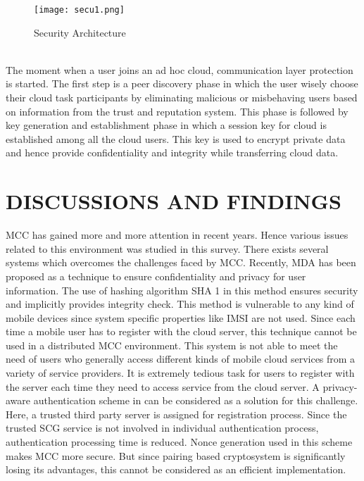 \documentclass[10pt,a4paper,journal]{IEEEtran}
\begin{document}
\begin{figure}[htbp]
\centering
\texttt{[image: secu1.png]} 
\caption{Security Architecture \cite{1}}
\label{10}
\end{figure}\\
The moment when a user joins an ad hoc cloud, communication layer protection is started. The first step is a peer discovery phase in which the user wisely choose their cloud task participants by
eliminating malicious or misbehaving users based on information from the trust and reputation system. This phase is followed by key generation and establishment phase in which a session key for cloud is established among all the cloud users. This key is used to encrypt private data and hence provide confidentiality and integrity while transferring cloud data. 


\section{DISCUSSIONS AND FINDINGS}
MCC has gained more and more attention in recent years. Hence various issues related to this environment was studied in this survey. There exists several systems which overcomes the challenges faced by MCC. Recently, MDA \cite{4} has been proposed as a technique to ensure confidentiality and privacy for user information. The use of hashing algorithm SHA 1 in this method ensures security and implicitly provides integrity check. This method is vulnerable to any kind of mobile devices since system specific properties like IMSI are not used. Since each time a mobile user has to register with the cloud server, this technique cannot be used in a distributed MCC environment. This system is not able to meet the need of users who generally access different kinds of mobile cloud services from a variety of service providers. It is extremely tedious task for users to register with the server each time they need to access service from the cloud server. A privacy-aware authentication scheme in \cite{5} can be considered as a solution for this challenge. Here, a trusted third party server is assigned for registration process. Since the trusted SCG service is not involved in individual authentication process, authentication processing time is reduced. Nonce generation used in this scheme makes MCC more secure. But since pairing based cryptosystem is significantly losing its advantages, this cannot be considered as an efficient implementation.\\
\end{document}
